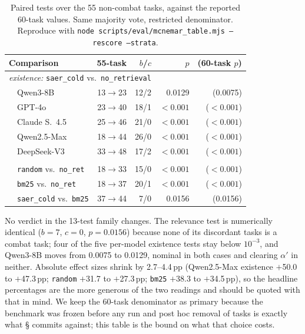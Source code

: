 \documentclass[letterpaper]{article} %
\newcommand{\bodyref}[1]{\getrefnumber{#1}}
\begin{document}
\begin{table}[htbp]
\caption{Paired tests over the 55 non-combat tasks, against the reported
60-task values.  Same majority vote, restricted denominator.  Reproduce with
\texttt{node scripts/eval/mcnemar\_table.mjs --rescore --strata}.}
\label{tab:nocombat}
\small\setlength{\tabcolsep}{5pt}
\centering
\begin{tabular}{lrrrr}
\toprule
Comparison & 55-task & $b$/$c$ & $p$ & (60-task $p$) \\
\midrule
\multicolumn{5}{l}{\emph{existence:} \texttt{saer\_cold} vs.\ \texttt{no\_retrieval}} \\
~~Qwen3-8B      & 13$\to$23 & 12/2 & 0.0129 & (0.0075) \\
~~GPT-4o        & 23$\to$40 & 18/1 & ${<}0.001$ & (${<}0.001$) \\
~~Claude S.\ 4.5 & 25$\to$46 & 21/0 & ${<}0.001$ & (${<}0.001$) \\
~~Qwen2.5-Max   & 18$\to$44 & 26/0 & ${<}0.001$ & (${<}0.001$) \\
~~DeepSeek-V3   & 33$\to$48 & 17/2 & ${<}0.001$ & (${<}0.001$) \\
\addlinespace
\multicolumn{5}{l}{\emph{ablation on Qwen2.5-Max}} \\
~~\texttt{random} vs.\ \texttt{no\_ret} & 18$\to$33 & 15/0 & ${<}0.001$ & (${<}0.001$) \\
~~\texttt{bm25} vs.\ \texttt{no\_ret}   & 18$\to$37 & 20/1 & ${<}0.001$ & (${<}0.001$) \\
~~\texttt{saer\_cold} vs.\ \texttt{bm25} & 37$\to$44 & 7/0 & 0.0156 & (0.0156) \\
\bottomrule
\end{tabular}
\end{table}

No verdict in the 13-test family changes.  The relevance test is numerically
identical ($b{=}7$, $c{=}0$, $p{=}0.0156$) because none of its discordant tasks
is a combat task; four of the five per-model existence tests stay below
$10^{-3}$, and Qwen3-8B moves from 0.0075 to 0.0129, nominal in both cases and
clearing $\alpha'$ in neither.  Absolute effect sizes shrink by 2.7--4.4\,pp
(Qwen2.5-Max existence $+$50.0 to $+$47.3\,pp; \texttt{random} $+$31.7 to
$+$27.3\,pp; \texttt{bm25} $+$38.3 to $+$34.5\,pp), so the headline percentages
are the more generous of the two readings and should be quoted with that in
mind.  We keep the 60-task denominator as primary because the benchmark was
frozen before any run and post hoc removal of tasks is exactly what
\S\bodyref{sec:tasks} commits against; this table is the bound on what that
choice costs.
\end{document}
